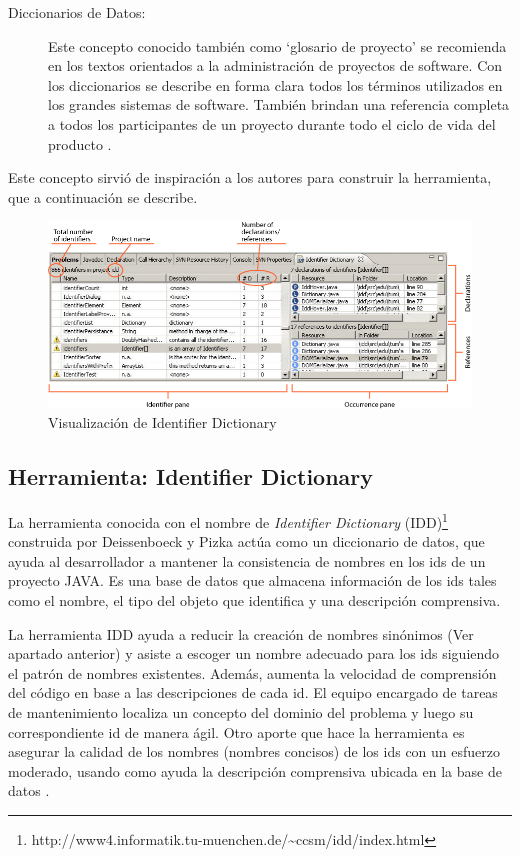 \begin{description}
\item[Diccionarios de Datos:] Este concepto conocido también como `glosario de proyecto' se recomienda en los textos orientados a la administración de proyectos de software. Con los diccionarios se describe en forma clara todos los términos utilizados en los grandes sistemas de software. También brindan una referencia completa a todos los participantes de un proyecto durante todo el ciclo de vida del producto \cite{RSPMGH02}.
\end{description}

Este concepto sirvió de inspiración a los autores para construir la herramienta, que a continuación se describe.

\begin{figure}[t!] %
\centerline{%
\includegraphics[scale= 0.55]{./cap3/idd_2.png}
}
\caption{Visualización de Identifier Dictionary}
\label{captura3}
\end{figure}

\pagebreak
\subsection{Herramienta: Identifier Dictionary}
\label{sec:algIdDic}
La herramienta conocida con el nombre de \textit{Identifier Dictionary} (IDD)\footnote[1]{http://www4.informatik.tu-muenchen.de/\~{}ccsm/idd/index.html} construida por Deissenboeck y Pizka \cite{DFPM05} actúa como un diccionario de datos, que ayuda al desarrollador a mantener la consistencia de nombres en los ids de un proyecto JAVA. Es una base de datos que almacena información de los ids tales como el nombre, el tipo del objeto que identifica y una descripción comprensiva.

La herramienta IDD ayuda a reducir la creación de nombres sinónimos (Ver apartado anterior) y asiste a escoger un nombre adecuado para los ids siguiendo el patrón de nombres existentes. Además, aumenta la velocidad de comprensión del código en base a las descripciones de cada id. El equipo encargado de tareas de mantenimiento localiza un concepto del dominio del problema y luego su correspondiente id de manera ágil. Otro aporte que hace la herramienta es asegurar la calidad de los nombres (nombres concisos) de los ids con un esfuerzo moderado, usando como ayuda la descripción comprensiva ubicada en la base de datos \cite{DFPM05,LFBEX07}.

